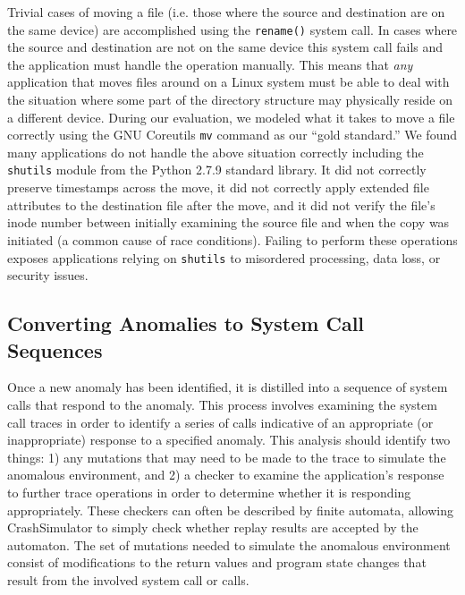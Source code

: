     Trivial cases of moving a file (i.e. those where the source and destination
    are on the same device) are accomplished using the {\tt rename()} system
    call.  In cases where the source and destination are not on the same device
    this system call fails and the application must handle the operation
    manually. This means that \emph{any} application that moves files around on
    a Linux system must be able to deal with the situation where some part of
    the directory structure may physically reside on a different device.
    During our evaluation, we modeled what
    it takes to move a file correctly using the GNU Coreutils {\tt mv} command
    as our ``gold standard.''  We found many applications do not handle the
    above situation correctly including the {\tt shutils} module from the Python
    2.7.9 standard library.  It did not correctly preserve timestamps across the
    move, it did not correctly apply extended file attributes to the destination
    file after the move, and it did not verify the file's inode number between
    initially examining the source file and when the copy was initiated (a
    common cause of race conditions).  Failing to perform these operations
    exposes applications relying on {\tt shutils} to misordered processing, data
    loss, or security issues.

    \subsection{Converting Anomalies to System Call Sequences}

    Once a new anomaly has been identified, it is distilled into a sequence of
    system calls that respond to the anomaly.  This process
    involves examining the system call traces
    in order to
    identify a series of calls indicative of an appropriate (or inappropriate)
    response to a specified anomaly.
    This analysis should identify two things: 1) any mutations that may need to be
    made to the trace to simulate the anomalous environment, and 2) a checker to
    examine the application's response to further trace operations in order to
    determine
    whether it is responding appropriately. These checkers can often be 
    described by finite automata, allowing CrashSimulator to simply check
    whether replay results are accepted by the automaton.  The set of mutations
    needed to simulate the anomalous environment consist of modifications
    to the return values and program state changes that result from the involved
    system call or calls.

